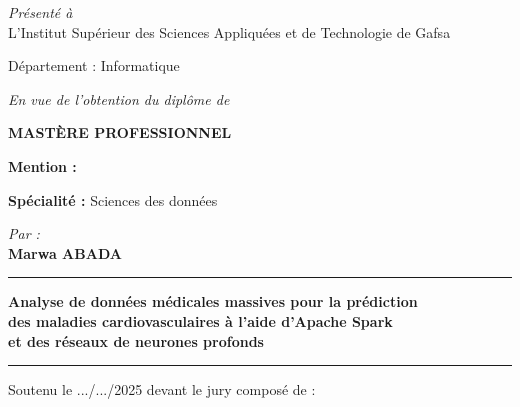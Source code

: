 \begin{titlepage}
\begin{center}
\vspace{0.3cm}

\small
\textit{Présenté à}\\[0.15cm]
L'Institut Supérieur des Sciences Appliquées et de Technologie de Gafsa

\vspace{0.3cm}

Département : Informatique

\vspace{0.3cm}

\textit{En vue de l'obtention du diplôme de}

\vspace{0.3cm}

{\Large \textbf{MASTÈRE PROFESSIONNEL}}
\vspace{0.3cm}
\begin{flushleft}
\hspace{2cm}\textbf{Mention :} \dotfill
\end{flushleft}

\vspace{-0.1cm}

\begin{flushleft}
\hspace{2cm}\textbf{Spécialité :} Sciences des données
\end{flushleft}

\vspace{0.2cm}

\textit{Par :}\\[0.1cm]
{\large \textbf{Marwa ABADA}}

\vspace{0.2cm}

\rule{7cm}{0.8pt}

\vspace{0.2cm}

{\normalsize \bfseries
Analyse de données médicales massives pour la prédiction\\[0.15cm]
des maladies cardiovasculaires à l'aide d'Apache Spark\\[0.15cm]
et des réseaux de neurones profonds
}

\vspace{0.2cm}

\rule{7cm}{0.8pt}

\vspace{0.2cm}

\small
Soutenu le .../.../2025 devant le jury composé de :

\vspace{0.3cm}


\end{center}
\end{titlepage}
